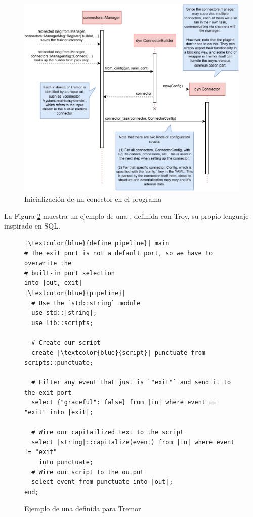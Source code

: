 \begin{figure}
    \centering
    \includegraphics[width=\textwidth]{./Imagenes/initializing.pdf}
    \caption{Inicialización de un conector en el programa}%
    \label{fig:tremor_initializing}
\end{figure}

La Figura \ref{fig:tremor_pipeline} muestra un ejemplo de una \pipeline,
definida con Troy, su propio lenguaje inspirado en SQL.

\begin{figure}
    \centering
    \begin{verbatim}
|\textcolor{blue}{define pipeline}| main
# The exit port is not a default port, so we have to overwrite the
# built-in port selection
into |out, exit|
|\textcolor{blue}{pipeline}|
  # Use the `std::string` module
  use std::|string|;
  use lib::scripts;

  # Create our script
  create |\textcolor{blue}{script}| punctuate from scripts::punctuate;

  # Filter any event that just is `"exit"` and send it to the exit port
  select {"graceful": false} from |in| where event == "exit" into |exit|;

  # Wire our capitailized text to the script
  select |string|::capitalize(event) from |in| where event != "exit"
    into punctuate;
  # Wire our script to the output
  select event from punctuate into |out|;
end;
    \end{verbatim}
    \caption{Ejemplo de una \pipeline definida para Tremor}%
    \label{fig:tremor_pipeline}
\end{figure}

